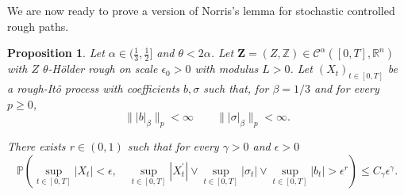 \documentclass[11pt,a4paper]{article}
\newcommand{\R}{\mathbb{R}}
\theoremstyle{plain}
\newtheorem{prop}[defn]{Proposition}
\begin{document}
We are now ready to prove a version of Norris's lemma for stochastic controlled rough paths.
\begin{prop}
    \label{pro: Norris lemma}
    Let $\alpha \in (\frac{1}{3}, \frac{1}{2}]$ and $\theta < 2\alpha$. Let $\mathbf{Z} = (Z, \mathbb{Z}) \in \mathscr{C}^{\alpha}([0,T],\R^n)$ with $Z$ $\theta$-H\"older rough on scale $\epsilon_0>0$ with modulus $L>0$. Let $(X_t)_{t\in[0,T]}$ be a rough-It\^o process with coefficients $b,\sigma$ such that, for $\beta = 1/3$ and for every $p\geq 0$,
    \begin{equation}
    \label{eq: assumption Norris lemma Hairer}
        \| |b|_{\beta} \|_{p} < \infty
        \qquad
        \| |\sigma|_{\beta} \|_{p} < \infty.
    \end{equation}
    
    There exists $r\in (0,1)$ such that for every $\gamma>0$ and $\epsilon > 0$
    \begin{equation*}
        \mathbb{P}\left(
        \sup_{t\in [0,T]}|X_t| < \epsilon,
        \quad
        \sup_{t\in[0,T]}|X^{\prime}_t| \vee \sup_{t\in[0,T]}|\sigma_t| \vee \sup_{t\in[0,T]}|b_t| > \epsilon^r
        \right)
        \leq C_{\gamma}\epsilon^{\gamma}.
    \end{equation*} 
\end{prop}
\end{document}
